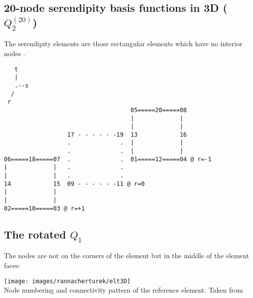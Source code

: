 \subsection{20-node serendipity basis functions in 3D ($Q_2^{(20)}$)}
 

The serendipity elements are those rectangular elements which have no
interior nodes \cite[p91]{reddybook2}.

\begin{verbatim}
   t
   |
   .--s
  /
 r
                                    05=====20=====08 
                                    |             |  
                                    |             |  
                  17 - - - - - -19  13            16
                  .              .  |             |  
                  .              .  |             |  
06=====18=====07  .              .  01=====12=====04 @ r=-1
|             |   .              . 
|             |   .              .  
14            15  09 - - - - - -11 @ r=0
|             |   
|             |  
02=====10=====03 @ r=+1
\end{verbatim}




%


\subsection{The rotated $Q_1$} \label{ss:rq1_3D}

The nodes are not on the corners of the element but in the middle of the
element faces:

\begin{center}
\texttt{[image: images/rannacherturek/elt3D]}\\
{\captionfont Node numbering and connectivity pattern of the reference element. Taken from \cite{gekm08}}
\end{center}

